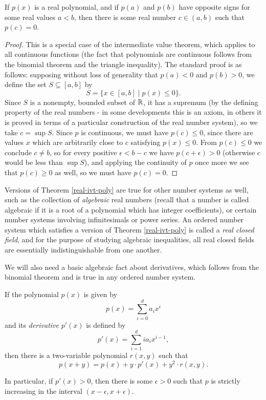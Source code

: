 \begin{thm}\label{real-ivt-poly} If $p(x)$ is a real polynomial, and if $p(a)$ and $p(b)$ have opposite signs for some real values $a < b$, then there is some real number $c \in (a,b)$ such that $p(c) = 0$.
\end{thm}
\begin{proof} This is a special case of the intermediate value theorem, which applies to all continuous functions (the fact that polynomials are continuous follows from the binomial theorem and the triangle inequality). The standard proof is as follows: supposing without loss of generality that $p(a) < 0$ and $p(b) > 0$, we define the set $S \subseteq [a,b]$ by
\[
S = \{x \in [a,b] \mid p(x) \le 0\}.
\]
Since $S$ is a nonempty, bounded subset of $\mathbb{R}$, it has a supremum (by the defining property of the real numbers - in some developments this is an axiom, in others it is proved in terms of a particular construction of the real number system), so we take $c = \sup S$. Since $p$ is continuous, we must have $p(c) \le 0$, since there are values $x$ which are arbitrarily close to $c$ satisfying $p(x) \le 0$. From $p(c) \le 0$ we conclude $c \ne b$, so for every positive $\epsilon < b-c$ we have $p(c+\epsilon) > 0$ (otherwise $c$ would be less than $\sup S$), and applying the continuity of $p$ once more we see that $p(c) \ge 0$ as well, so we must have $p(c) = 0$.
\end{proof}

Versions of Theorem \ref{real-ivt-poly} are true for other number systems as well, such as the collection of \emph{algebraic} real numbers (recall that a number is called algebraic if it is a root of a polynomial which has integer coefficients), or certain number systems involving infinitesimals or power series. An ordered number system which satisfies a version of Theorem \ref{real-ivt-poly} is called a \emph{real closed field}, and for the purpose of studying algebraic inequalities, all real closed fields are essentially indistinguishable from one another.

We will also need a basic algebraic fact about derivatives, which follows from the binomial theorem and is true in any ordered number system.

\begin{prop} If the polynomial $p(x)$ is given by
\[
p(x) = \sum_{i=0}^d a_i x^i
\]
and its \emph{derivative} $p'(x)$ is defined by
\[
p'(x) = \sum_{i=1}^{d} ia_i x^{i-1},
\]
then there is a two-variable polynomial $r(x,y)$ such that
\[
p(x + y) = p(x) + y\cdot p'(x) + y^2\cdot r(x,y).
\]

In particular, if $p'(x) > 0$, then there is some $\epsilon > 0$ such that $p$ is strictly increasing in the interval $(x-\epsilon, x+\epsilon)$.
\end{prop}


